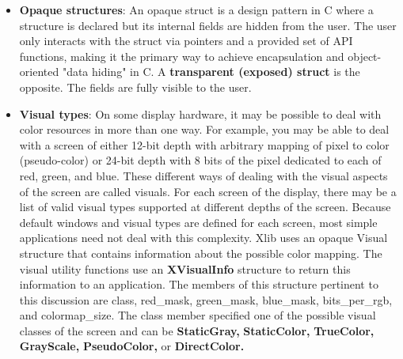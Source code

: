 \documentclass{report}
\begin{document}
\begin{itemize}
\begin{itemize}
\begin{itemize}
                    \end{itemize}
                    \bigbreak \noindent 
                    Developers working directly with window operations rely on specific EWMH messages (denoted by the \textbf{\_NET} prefix): 
                    \begin{itemize}
                        \item \textbf{\_NET\_ACTIVE\_WINDOW}: Tells the window manager to give focus to a specific window.
                        \item \textbf{\_NET\_CLOSE\_WINDOW}: Requests a graceful closure of an application window.
                        \item \textbf{\_NET\_WM\_PING}: Allows the window manager to check if an application has stopped responding.
                    \end{itemize}
            \end{itemize}
            \textbf{Note:} EWMH is not standalone in the strict compliance sense. The EWMH spec explicitly says it builds on ICCCM, and that window managers and clients that aim to fulfill EWMH must also adhere to ICCCM, except where EWMH explicitly modifies ICCCM behavior.
        \item \textbf{Opaque structures}: An opaque struct is a design pattern in C where a structure is declared but its internal fields are hidden from the user. The user only interacts with the struct via pointers and a provided set of API functions, making it the primary way to achieve encapsulation and object-oriented "data hiding" in C. 
            \bigbreak \noindent 
            A \textbf{transparent (exposed) struct} is the opposite. The fields are fully visible to the user.
        \item \textbf{Visual types}: On some display hardware, it may be possible to deal with color resources in more than one way. For example, you may be able to deal with a screen of either 12-bit depth with arbitrary mapping of pixel to color (pseudo-color) or 24-bit depth with 8 bits of the pixel dedicated to each of red, green, and blue. These different ways of dealing with the visual aspects of the screen are called visuals. For each screen of the display, there may be a list of valid visual types supported at different depths of the screen. Because default windows and visual types are defined for each screen, most simple applications need not deal with this complexity. 
            \bigbreak \noindent 
            Xlib uses an opaque Visual structure that contains information about the possible color mapping. The visual utility functions use an \textbf{XVisualInfo} structure to return this information to an application. The members of this structure pertinent to this discussion are class, red\_mask, green\_mask, blue\_mask, bits\_per\_rgb, and colormap\_size. The class member specified one of the possible visual classes of the screen and can be \textbf{StaticGray,} \textbf{StaticColor,} \textbf{TrueColor,} \textbf{GrayScale,} \textbf{PseudoColor,} or \textbf{DirectColor.}

\end{itemize}
\end{document}
